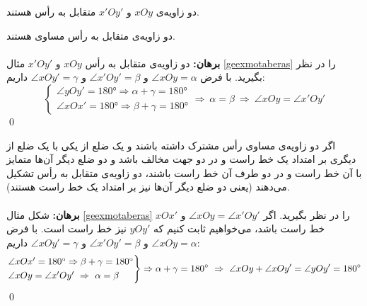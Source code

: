\begin{example} \label{geexmotaberas}
	دو زاویه‌ی $xOy$ و $x'Oy'$ متقابل به رأس هستند.
	\begin{center}
	\end{center}
\end{example}
\begin{theorem}
	دو زاویه‌ی متقابل به رأس مساوی هستند.
	\\ \dfth \\
	\textbf{برهان:}
	دو زاویه‌ی متقابل به رأس $xOy$ و $x'Oy'$ مثال
	\ref{geexmotaberas}
	را در نظر بگیرید. با فرض
	$\angle xOy = \alpha$ و $\angle x'Oy' = \beta$ و $\angle xOy' = \gamma$
	داریم:
	\[
	\begin{cases}
		\angle yOy' = \ang{180} \Rightarrow \alpha + \gamma = \ang{180} \\
		\angle xOx' = \ang{180} \Rightarrow \beta + \gamma = \ang{180}
	\end{cases}
	\Rightarrow \ \alpha = \beta \ \Rightarrow \ \angle xOy = \angle x'Oy'
	\]
	\qed
\end{theorem}
\begin{theorem}
	اگر دو زاویه‌ی مساوی رأس مشترک داشته باشند و یک ضلع از یکی با یک ضلع از دیگری بر امتداد یک خط راست و در دو جهت مخالف باشد و دو ضلع دیگر آن‌ها متمایز با آن خط راست و در دو طرف آن خط راست باشند، دو زاویه‌ی متقابل به رأس تشکیل می‌دهند (یعنی دو ضلع دیگر آن‌ها نیز بر امتداد یک خط راست هستند).
	\\ \dfth \\
	\textbf{برهان:}
	شکل مثال
	\ref{geexmotaberas}
	را در نظر بگیرید. اگر
	$\angle xOy = \angle x'Oy'$
	و $xOx'$ خط راست باشد، می‌خواهیم ثابت کنیم که
	$yOy'$
	نیز خط راست است.  با فرض
	$\angle xOy = \alpha$ و $\angle x'Oy' = \beta$ و $\angle xOy' = \gamma$
	داریم:
	\[
	\begin{rcases}
		\angle xOx' = \ang{180} \Rightarrow \beta + \gamma = \ang{180} \\
		\angle xOy = \angle x'Oy' \ \Rightarrow \ \alpha = \beta
	\end{rcases}
	\Rightarrow \alpha + \gamma = \ang{180} \ \Rightarrow \ \angle xOy + \angle xOy' = \angle yOy' = \ang{180}
	\]
	\qed
\end{theorem}

